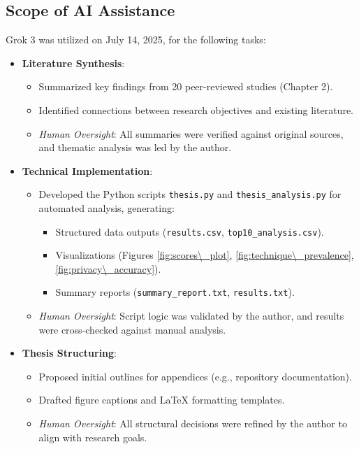 \documentclass[12pt]{report}
\begin{document}
\subsection*{Scope of AI Assistance}
Grok 3 was utilized on July 14, 2025, for the following tasks:
\begin{itemize}
    \item \textbf{Literature Synthesis}: 
    \begin{itemize}
        \item Summarized key findings from 20 peer-reviewed studies (Chapter 2).
        \item Identified connections between research objectives and existing literature.
        \item \textit{Human Oversight}: All summaries were verified against original sources, and thematic analysis was led by the author.
    \end{itemize}
    
    \item \textbf{Technical Implementation}:
    \begin{itemize}
        \item Developed the Python scripts \texttt{thesis.py} and \texttt{thesis\_analysis.py} for automated analysis, generating:
        \begin{itemize}
            \item Structured data outputs (\texttt{results.csv}, \texttt{top10\_analysis.csv}).
            \item Visualizations (Figures \ref{fig:scores\_plot}, \ref{fig:technique\_prevalence}, \ref{fig:privacy\_accuracy}).
            \item Summary reports (\texttt{summary\_report.txt}, \texttt{results.txt}).
        \end{itemize}
        \item \textit{Human Oversight}: Script logic was validated by the author, and results were cross-checked against manual analysis.
    \end{itemize}
    
    \item \textbf{Thesis Structuring}:
    \begin{itemize}
        \item Proposed initial outlines for appendices (e.g., repository documentation).
        \item Drafted figure captions and LaTeX formatting templates.
        \item \textit{Human Oversight}: All structural decisions were refined by the author to align with research goals.
    \end{itemize}
    

\end{itemize}
\end{document}
